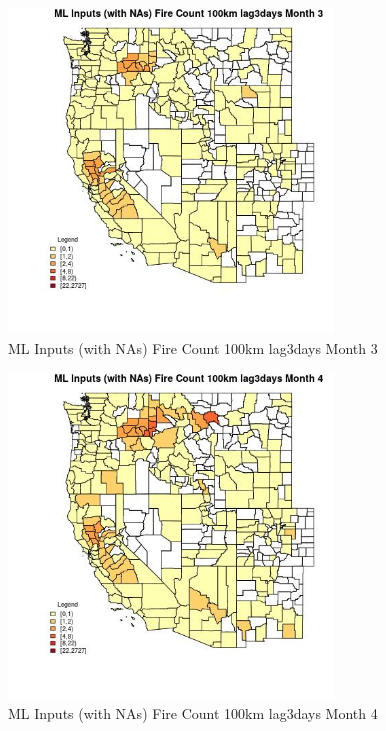 \clearpage 

\begin{figure} 
\centering  
\includegraphics[width=0.77\textwidth]{Code_Outputs/Report_ML_input_PM25_Step4_part_f_de_duplicated_aveswNAs_CountyFire_Count_100km_lag3daysmedianMonth3.jpg} 
\caption{\label{fig:Report_ML_input_PM25_Step4_part_f_de_duplicated_aveswNAsCountyFire_Count_100km_lag3daysmedianMonth3}ML Inputs (with NAs) Fire Count 100km lag3days Month 3} 
\end{figure} 
 

\begin{figure} 
\centering  
\includegraphics[width=0.77\textwidth]{Code_Outputs/Report_ML_input_PM25_Step4_part_f_de_duplicated_aveswNAs_CountyFire_Count_100km_lag3daysmedianMonth4.jpg} 
\caption{\label{fig:Report_ML_input_PM25_Step4_part_f_de_duplicated_aveswNAsCountyFire_Count_100km_lag3daysmedianMonth4}ML Inputs (with NAs) Fire Count 100km lag3days Month 4} 
\end{figure} 
 

